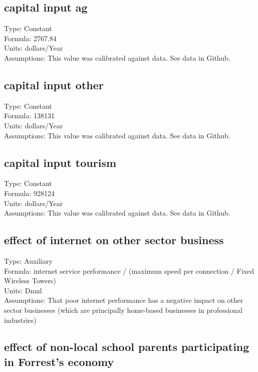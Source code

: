 \documentclass[
  11pt,
]{book}
\begin{document}
\hypertarget{capital-input-ag}{%
\subsection{capital input ag}\label{capital-input-ag}}

Type: Constant\\
Formula: 2767.84\\
Units: dollars/Year\\
Assumptions: This value was calibrated against data. See data in Github.

\hypertarget{capital-input-other}{%
\subsection{capital input other}\label{capital-input-other}}

Type: Constant\\
Formula: 138131\\
Units: dollars/Year\\
Assumptions: This value was calibrated against data. See data in Github.

\hypertarget{capital-input-tourism}{%
\subsection{capital input tourism}\label{capital-input-tourism}}

Type: Constant\\
Formula: 928124\\
Units: dollars/Year\\
Assumptions: This value was calibrated against data. See data in Github.

\hypertarget{effect-of-internet-on-other-sector-business}{%
\subsection{effect of internet on other sector business}\label{effect-of-internet-on-other-sector-business}}

Type: Auxiliary\\
Formula: internet service performance / (maximum speed per connection / Fixed Wireless Towers)\\
Units: Dmnl\\
Assumptions: That poor internet performance has a negative impact on other sector businesses (which are principally home-based businesses in professional industries)

\hypertarget{effect-of-non-local-school-parents-participating-in-forrests-economy}{%
\subsection{effect of non-local school parents participating in Forrest's economy}\label{effect-of-non-local-school-parents-participating-in-forrests-economy}}
\end{document}
